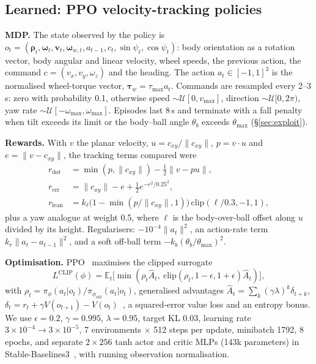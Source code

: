 \documentclass[conference]{IEEEtran}
\theoremstyle{remark}
\begin{document}
\subsection{Learned: PPO velocity-tracking policies}\label{sec:rl}
\textbf{MDP.} The state observed by the policy is $o_t=(\bm\rho_t,\bm\omega_t,\bm v_t,\bm\omega_{w,t},a_{t-1},c_t,\sin\psi_t,\cos\psi_t)$: body orientation as a rotation vector, body angular and linear velocity, wheel speeds, the previous action, the command $c=(v_x,v_y,\omega_z)$ and the heading. The action $a_t\in[-1,1]^3$ is the normalised wheel-torque vector, $\bm\tau_w=\tau_{\max}a_t$. Commands are resampled every 2--3\,s: zero with probability 0.1, otherwise speed $\sim\mathcal U[0,v_{\max}]$, direction $\sim\mathcal U[0,2\pi)$, yaw rate $\sim\mathcal U[-\omega_{\max},\omega_{\max}]$. Episodes last 8\,s and terminate with a fall penalty when tilt exceeds its limit or the body--ball angle $\theta_b$ exceeds $\theta_{\max}$ (\S\ref{sec:exploit}).

\textbf{Rewards.} With $v$ the planar velocity, $u=c_{xy}/\lVert c_{xy}\rVert$, $p=v\cdot u$ and $e=\lVert v-c_{xy}\rVert$, the tracking terms compared were
\begin{align}
r_{\mathrm{dot}}&=\min(p,\lVert c_{xy}\rVert)-\tfrac12\lVert v-pu\rVert,\\
r_{\mathrm{err}}&=\lVert c_{xy}\rVert-e+\tfrac12 e^{-e^2/0.25^2},\\
r_{\mathrm{lean}}&=k_\ell\big(1-\min(p/\lVert c_{xy}\rVert,1)\big)\,\mathrm{clip}(\ell/0.3,-1,1),
\end{align}
plus a yaw analogue at weight 0.5, where $\ell$ is the body-over-ball offset along $u$ divided by its height. Regularisers: $-10^{-4}\lVert a_t\rVert^2$, an action-rate term $k_r\lVert a_t-a_{t-1}\rVert^2$, and a soft off-ball term $-k_b(\theta_b/\theta_{\max})^2$.

\textbf{Optimisation.} PPO~\cite{schulman2017} maximises the clipped surrogate
\begin{equation}
L^{\mathrm{CLIP}}(\phi)=\mathbb E_t\big[\min(\rho_t\hat A_t,\ \mathrm{clip}(\rho_t,1-\epsilon,1+\epsilon)\hat A_t)\big],
\end{equation}
with $\rho_t=\pi_\phi(a_t|o_t)/\pi_{\phi_{\mathrm{old}}}(a_t|o_t)$, generalised advantages $\hat A_t=\sum_k(\gamma\lambda)^k\delta_{t+k}$, $\delta_t=r_t+\gamma V(o_{t+1})-V(o_t)$~\cite{schulman2016}, a squared-error value loss and an entropy bonus. We use $\epsilon=0.2$, $\gamma=0.995$, $\lambda=0.95$, target KL 0.03, learning rate $3{\times}10^{-4}\!\to\!3{\times}10^{-5}$, 7 environments $\times$ 512 steps per update, minibatch 1792, 8 epochs, and separate $2{\times}256$ tanh actor and critic MLPs (143k parameters) in Stable-Baselines3~\cite{raffin2021}, with running observation normalisation.
\end{document}
